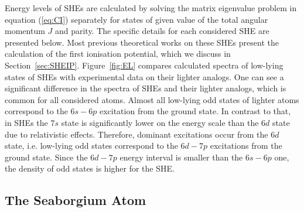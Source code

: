 \documentclass[10pt,a4paper, twoside, openright]{report}
\begin{document}
Energy levels of SHEs are calculated by solving the matrix eigenvalue problem in equation (\ref{eq:CI}) separately for states of given value of the total angular momentum $J$ and parity. The specific details for each considered SHE are presented below. Most previous theoretical works on these SHEs present the calculation of the first ionisation potential, which we discuss in Section~\ref{sec:SHEIP}. Figure~\ref{fig:EL} compares calculated spectra of low-lying states of SHEs with experimental data on their lighter analogs. One can see a significant difference in the spectra of SHEs and their lighter analogs, which is common for all considered atoms. Almost all low-lying odd states of lighter atoms correspond to the $6s-6p$ excitation from the ground state. In contrast to that, in SHEs the $7s$ state is significantly lower on the energy scale than the $6d$ state due to relativistic effects. Therefore, dominant excitations occur from the $6d$ state, i.e. low-lying odd states correspond to the $6d-7p$ excitations from the ground state. Since the $6d-7p$ energy interval is smaller than the $6s-6p$ one, the density of odd states is higher for the SHE. 


\subsection{The Seaborgium Atom} \label{sec:Sg}
\end{document}
